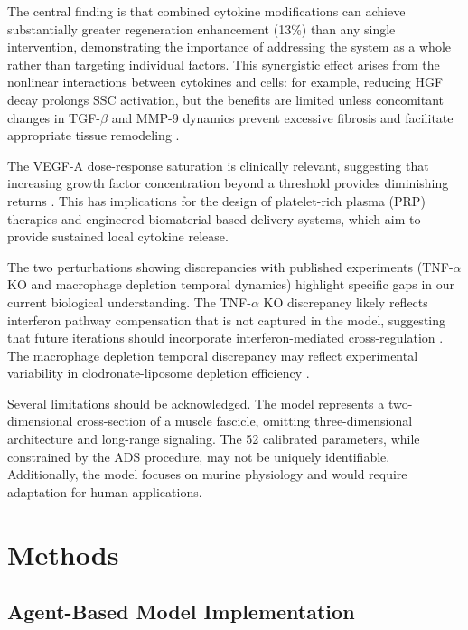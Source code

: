 \documentclass[11pt]{article}
\begin{document}
The central finding is that combined cytokine modifications can achieve substantially greater regeneration enhancement (13\%) than any single intervention, demonstrating the importance of addressing the system as a whole rather than targeting individual factors. This synergistic effect arises from the nonlinear interactions between cytokines and cells: for example, reducing HGF decay prolongs SSC activation, but the benefits are limited unless concomitant changes in TGF-$\beta$ and MMP-9 dynamics prevent excessive fibrosis and facilitate appropriate tissue remodeling \citep{murphy1999satellites, wosczyna2018mesenchymal}.

The VEGF-A dose-response saturation is clinically relevant, suggesting that increasing growth factor concentration beyond a threshold provides diminishing returns \citep{ferrara2003biology}. This has implications for the design of platelet-rich plasma (PRP) therapies and engineered biomaterial-based delivery systems, which aim to provide sustained local cytokine release.

The two perturbations showing discrepancies with published experiments (TNF-$\alpha$ KO and macrophage depletion temporal dynamics) highlight specific gaps in our current biological understanding. The TNF-$\alpha$ KO discrepancy likely reflects interferon pathway compensation that is not captured in the model, suggesting that future iterations should incorporate interferon-mediated cross-regulation \citep{li2001tnf}. The macrophage depletion temporal discrepancy may reflect experimental variability in clodronate-liposome depletion efficiency \citep{summan2006macrophages}.

Several limitations should be acknowledged. The model represents a two-dimensional cross-section of a muscle fascicle, omitting three-dimensional architecture and long-range signaling. The 52 calibrated parameters, while constrained by the ADS procedure, may not be uniquely identifiable. Additionally, the model focuses on murine physiology and would require adaptation for human applications.

\section{Methods}

\subsection{Agent-Based Model Implementation}
\end{document}

